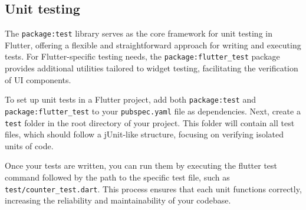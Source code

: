 \subsection{Unit testing}
The \texttt{package:test} library serves as the core framework for unit testing in Flutter, offering a flexible and straightforward approach for writing and executing tests. 
For Flutter-specific testing needs, the \texttt{package:flutter\_test} package provides additional utilities tailored to widget testing, facilitating the verification of UI components.

To set up unit tests in a Flutter project, add both \texttt{package:test} and \texttt{package:flutter\_test} to your \texttt{pubspec.yaml} file as dependencies. 
Next, create a \texttt{test} folder in the root directory of your project. This folder will contain all test files, which should follow a jUnit-like structure, focusing on verifying isolated units of code.

Once your tests are written, you can run them by executing the flutter test command followed by the path to the specific test file, such as \texttt{test/counter\_test.dart}. 
This process ensures that each unit functions correctly, increasing the reliability and maintainability of your codebase.
